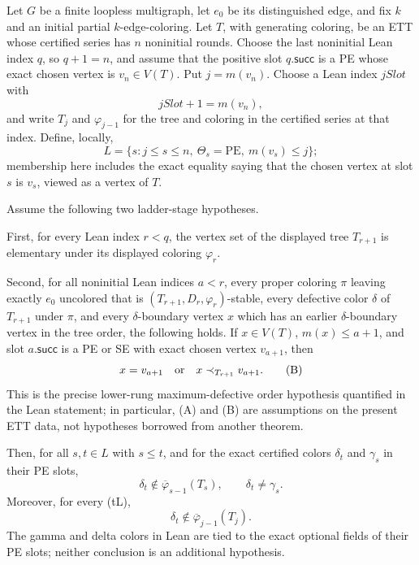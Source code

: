 \begin{lemma}
Let \(G\) be a finite loopless multigraph, let \(e_0\) be its
distinguished edge, and fix \(k\) and an initial partial \(k\)-edge-coloring.
Let \(T\), with generating coloring, be an ETT whose certified series has
\(n\) noninitial rounds.  Choose the last noninitial Lean index \(q\), so
\(q+1=n\), and assume that the positive slot \(q.\mathsf{succ}\) is a PE
whose exact chosen vertex is \(v_n\in V(T)\).  Put \(j=m(v_n)\).  Choose a
Lean index \(jSlot\) with
\[
                         jSlot+1=m(v_n),
\]
and write \(T_j\) and \(\varphi_{j-1}\) for the tree and coloring in the
certified series at that index.  Define, locally,
\[
 L=\{s:j\leq s\leq n,\ \Theta_s=\mathrm{PE},\
                         m(v_s)\leq j\};                       \tag{A}
\]
membership here includes the exact equality saying that the chosen vertex
at slot \(s\) is \(v_s\), viewed as a vertex of \(T\).

Assume the following two ladder-stage hypotheses.

First, for every Lean index \(r<q\), the vertex set of the displayed tree
\(T_{r+1}\) is elementary under its displayed coloring \(\varphi_r\).

Second, for all noninitial Lean indices \(a<r\), every proper coloring
\(\pi\) leaving exactly \(e_0\) uncolored that is
\((T_{r+1},D_r,\varphi_r)\)-stable, every defective color \(\delta\) of
\(T_{r+1}\) under \(\pi\), and every \(\delta\)-boundary vertex \(x\)
which has an earlier \(\delta\)-boundary vertex in the tree order, the
following holds.  If \(x\in V(T)\), \(m(x)\leq a+1\), and slot
\(a.\mathsf{succ}\) is a PE or SE with exact chosen vertex \(v_{a+1}\), then
\[
         x=v_{a+1}\quad\hbox{or}\quad x\prec_{T_{r+1}}v_{a+1}. \tag{B}
\]
This is the precise lower-rung maximum-defective order hypothesis quantified
in the Lean statement; in particular, (A) and (B) are assumptions on the
present ETT data, not hypotheses borrowed from another theorem.

Then, for all \(s,t\in L\) with \(s\leq t\), and for the exact certified
colors \(\delta_t\) and \(\gamma_s\) in their PE slots,
\[
 \delta_t\notin\overline\varphi_{s-1}(T_s),
 \qquad \delta_t\ne\gamma_s.                                  \tag{1}
\]
Moreover, for every (t\in L),
\[
                  \delta_t\notin\overline\varphi_{j-1}(T_j).  \tag{2}
\]
The gamma and delta colors in Lean are tied to the exact optional fields
of their PE slots; neither conclusion is an additional hypothesis.
\end{lemma}

